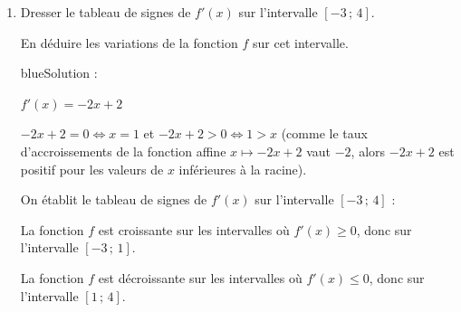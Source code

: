 \documentclass[10pt]{article}
\begin{document}
\begin{enumerate}[start=5]
\begin{enumerate}[label=\alph*)]
\item Dresser le tableau de signes de $f'(x)$ sur l'intervalle $[-3\,;\,4]$.\par En déduire les variations de la fonction $f$ sur cet intervalle.

\begin{color}{blue}Solution :\par

$f'(x) =  -2x+2 $ 

$-2x+2 = 0 \iff x = 1$ et $-2x+2 > 0 \iff 1 > x$ (comme le taux d'accroissements de la fonction affine $x\longmapsto -2x+2 $ vaut $-2$, alors $-2x+2$ est positif pour les valeurs de $x$ inférieures à la racine).

On établit le tableau de signes de $f'(x)$ sur l'intervalle $[-3\,;\,4]$ :


La fonction $f$ est croissante sur les intervalles où $f'(x)\geqslant 0$, donc sur l'intervalle $[-3\,;\,1]$.

La fonction $f$ est décroissante sur les intervalles où $f'(x)\leqslant 0$, donc sur l'intervalle $[1\,;\,4]$.

\end{color}

\end{enumerate}
\end{enumerate}

\bigskip
\end{document}
